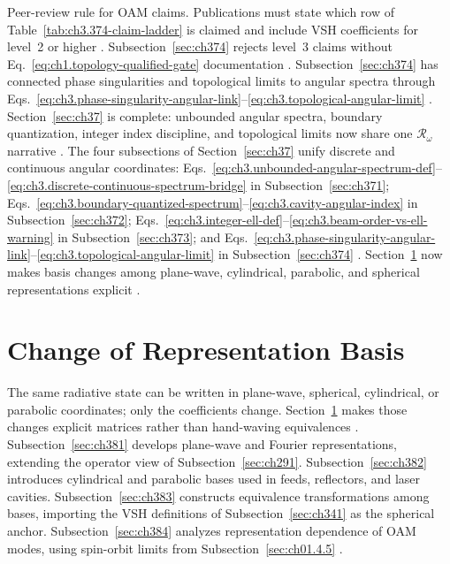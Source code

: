 Peer-review rule for OAM claims. Publications must state which row of Table~\ref{tab:ch3.374-claim-ladder} is claimed and include VSH coefficients for level~2 or higher
\cite{belinfante1940}. Subsection~\ref{sec:ch374} rejects level~3 claims without
Eq.~\eqref{eq:ch1.topology-qualified-gate} documentation \cite{harrington2001}.
Subsection~\ref{sec:ch374} has connected phase singularities and topological limits to angular spectra through
Eqs.~\eqref{eq:ch3.phase-singularity-angular-link}--\eqref{eq:ch3.topological-angular-limit}
\cite{allen1992}. Section~\ref{sec:ch37} is complete: unbounded angular spectra,
boundary quantization, integer index discipline, and topological limits now share one \(\mathcal{R}_\omega\) narrative
\cite{hansen1988}.
The four subsections of Section~\ref{sec:ch37} unify discrete and continuous angular coordinates:
Eqs.~\eqref{eq:ch3.unbounded-angular-spectrum-def}--\eqref{eq:ch3.discrete-continuous-spectrum-bridge} in
Subsection~\ref{sec:ch371}; Eqs.~\eqref{eq:ch3.boundary-quantized-spectrum}--\eqref{eq:ch3.cavity-angular-index} in
Subsection~\ref{sec:ch372}; Eqs.~\eqref{eq:ch3.integer-ell-def}--\eqref{eq:ch3.beam-order-vs-ell-warning} in
Subsection~\ref{sec:ch373}; and Eqs.~\eqref{eq:ch3.phase-singularity-angular-link}--\eqref{eq:ch3.topological-angular-limit}
in Subsection~\ref{sec:ch374} \cite{stratton1941}. Section~\ref{sec:ch38} now makes
basis changes among plane-wave, cylindrical, parabolic, and spherical representations explicit
\cite{hansen1988}.
\section{Change of Representation Basis}
\label{sec:ch38}
The same radiative state can be written in plane-wave, spherical, cylindrical, or parabolic coordinates;
only the coefficients change. Section~\ref{sec:ch38} makes those changes explicit matrices rather than
hand-waving equivalences \cite{stratton1941}. Subsection~\ref{sec:ch381} develops plane-wave and
Fourier representations, extending the operator view of Subsection~\ref{sec:ch291}. Subsection~\ref{sec:ch382}
introduces cylindrical and parabolic bases used in feeds, reflectors, and laser cavities.
Subsection~\ref{sec:ch383} constructs equivalence transformations among bases, importing the VSH definitions
of Subsection~\ref{sec:ch341} as the spherical anchor. Subsection~\ref{sec:ch384} analyzes representation
dependence of OAM modes, using spin-orbit limits from Subsection~\ref{sec:ch01.4.5} \cite{allen1992}.
